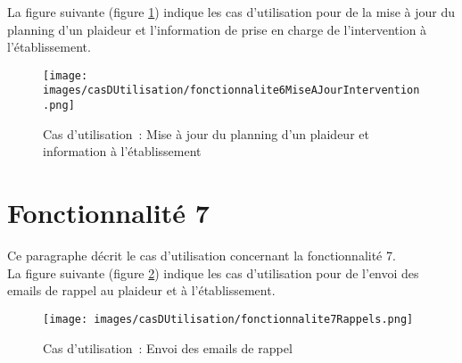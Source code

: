 La figure suivante (figure \ref{diagrammeCasUtilisation6}) indique les cas d'utilisation pour de la mise à jour du planning d'un plaideur et l'information de prise en charge de l'intervention à l'établissement.
\begin{figure}[H]
	\centering
	\texttt{[image: images/casDUtilisation/fonctionnalite6MiseAJourIntervention.png]}
	\caption{Cas d'utilisation~: Mise à jour du planning d'un plaideur et information à l'établissement}
	\label{diagrammeCasUtilisation6}
\end{figure}




\section{Fonctionnalité 7}
Ce paragraphe décrit le cas d'utilisation concernant la fonctionnalité 7.\\

La figure suivante (figure \ref{diagrammeCasUtilisation7}) indique les cas d'utilisation pour de l'envoi des emails de rappel au plaideur et à l'établissement.
\begin{figure}[H]
	\centering
	\texttt{[image: images/casDUtilisation/fonctionnalite7Rappels.png]}
	\caption{Cas d'utilisation~: Envoi des emails de rappel}
	\label{diagrammeCasUtilisation7}
\end{figure}